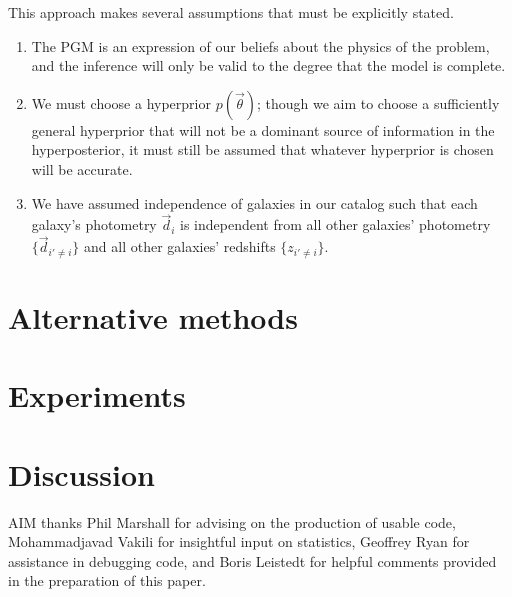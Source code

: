 \documentclass[preprint]{aastex}
\begin{document}
This approach makes several assumptions that must be explicitly stated.
\begin{enumerate}
\item The PGM is an expression of our beliefs about the physics of the problem, and the inference will only be valid to the degree that the model is complete.
\item We must choose a hyperprior $p(\vec{\theta})$; though we aim to choose a sufficiently general hyperprior that will not be a dominant source of information in the hyperposterior, it must still be assumed that whatever hyperprior is chosen will be accurate.
\item We have assumed independence of galaxies in our catalog such that each galaxy's photometry $\vec{d}_{i}$ is independent from all other galaxies' photometry $\{\vec{d}_{i'\neq i}\}$ and all other galaxies' redshifts $\{z_{i'\neq i}\}$.
\end{enumerate}


\section{Alternative methods}
\label{sec:alternatives}

\section{Experiments}
\label{sec:experiments}

\section{Discussion}
\label{sec:discussion}


\begin{acknowledgements}
AIM thanks Phil Marshall for advising on the production of usable code, Mohammadjavad Vakili for insightful input on statistics, Geoffrey Ryan for assistance in debugging code, and Boris Leistedt for helpful comments provided in the preparation of this paper.
\end{acknowledgements}



\end{document}
